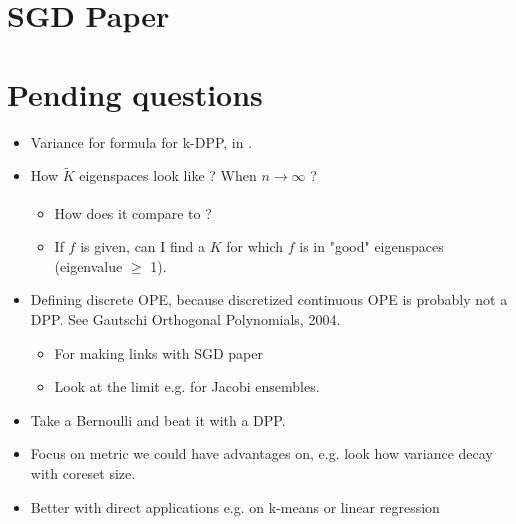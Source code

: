 \documentclass{article}
\theoremstyle{definition}
\begin{document}
\section{SGD Paper}


\section{Pending questions}
\begin{itemize}
	\item Variance for formula for k-DPP, in \cite{zhang2017dppminibatch}.
	\item How $\tilde K$ eigenspaces look like ? When $n \xrightarrow[]{} \infty$ ?
	\begin{itemize}
		\item How does it compare to \cite{bardenet2020mcdpp} ?
		\item If $f$ is given, can I find a $K$ for which $f$ is in "good" eigenspaces (eigenvalue $\geq$ 1).
	\end{itemize}
	\item Defining discrete OPE, because discretized continuous OPE is probably not a DPP. See Gautschi Orthogonal Polynomials, 2004.
	\begin{itemize}
		\item For making links with SGD paper \cite{bardenet2021sgddpp}
		\item Look at the limit e.g. for Jacobi ensembles. 
	\end{itemize}
\end{itemize}

\vspace{1cm}

\begin{itemize}
	\item Take a Bernoulli and beat it with a DPP.
	\item Focus on metric we could have advantages on, e.g. look how variance decay with coreset size. 
	\item Better with direct applications e.g. on k-means or linear regression
\end{itemize}
	
	\vfill
	
	
	\printbibliography
%	 
%	 
	
\end{document}
